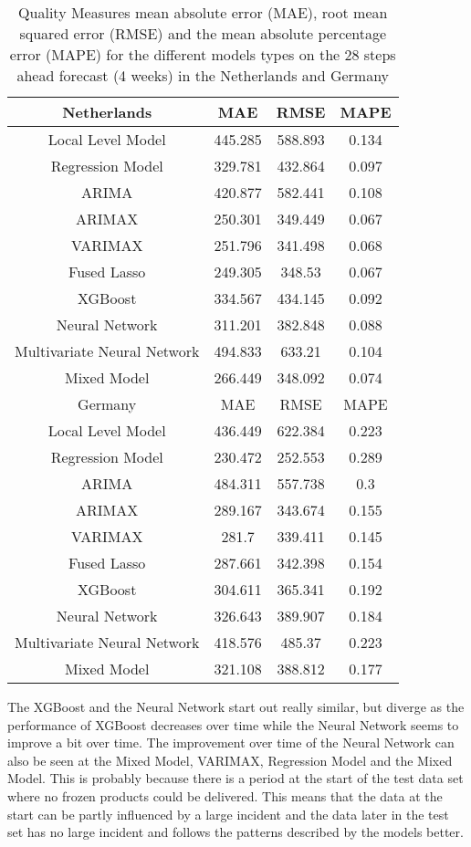 \begin{table}[]
    \centering
    \begin{tabular}{|c|c c c|}\hline
        Netherlands & MAE & RMSE & MAPE\\\hline
        Local Level Model & 445.285 & 588.893 & 0.134\\
        Regression Model & 329.781 & 432.864 & 0.097\\
        ARIMA & 420.877 & 582.441 & 0.108\\
        ARIMAX & 250.301 & 349.449 & 0.067\\
        VARIMAX & 251.796 & 341.498 & 0.068\\
        Fused Lasso & 249.305 & 348.53 & 0.067\\
        XGBoost & 334.567 & 434.145 & 0.092\\
        Neural Network & 311.201 & 382.848 & 0.088\\
        Multivariate Neural Network & 494.833 & 633.21 & 0.104\\
        Mixed Model & 266.449 & 348.092 & 0.074\\\hline\hline
        Germany & MAE & RMSE & MAPE\\\hline
        Local Level Model & 436.449 & 622.384 & 0.223\\
        Regression Model & 230.472 & 252.553 & 0.289\\
        ARIMA & 484.311 & 557.738 & 0.3\\
        ARIMAX & 289.167 & 343.674 & 0.155\\
        VARIMAX & 281.7 & 339.411 & 0.145\\
        Fused Lasso & 287.661 & 342.398 & 0.154\\
        XGBoost & 304.611 & 365.341 & 0.192\\
        Neural Network & 326.643 & 389.907 & 0.184\\
        Multivariate Neural Network & 418.576 & 485.37 & 0.223\\
        Mixed Model & 321.108 & 388.812 & 0.177\\\hline
    \end{tabular}
    \caption{Quality Measures mean absolute error (MAE), root mean squared error (RMSE) and the mean absolute percentage error (MAPE) for the different models types on the 28 steps ahead forecast (4 weeks) in the Netherlands and Germany}
    \label{tab:4 weeks ahead}
\end{table}
The XGBoost and the Neural Network start out really similar, but diverge as the performance of XGBoost decreases over time while the Neural Network seems to improve a bit over time. The improvement over time of the Neural Network can also be seen at the Mixed Model, VARIMAX, Regression Model and the Mixed Model. This is probably because there is a period at the start of the test data set where no frozen products could be delivered. This means that the data at the start can be partly influenced by a large incident and the data later in the test set has no large incident and follows the patterns described by the models better.\\

